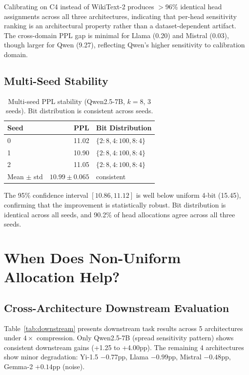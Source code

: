 \documentclass[11pt,a4paper]{article}
\begin{document}
Calibrating on C4 instead of WikiText-2 produces $>$96\% identical head assignments across all three architectures, indicating that per-head sensitivity ranking is an architectural property rather than a dataset-dependent artifact.
The cross-domain PPL gap is minimal for Llama (0.20) and Mistral (0.03), though larger for Qwen (9.27), reflecting Qwen's higher sensitivity to calibration domain.

\subsection{Multi-Seed Stability}

\begin{table}[h]
\centering
\caption{Multi-seed PPL stability (Qwen2.5-7B, $k{=}8$, 3 seeds). Bit distribution is consistent across seeds.}
\label{tab:multi_seed}
\begin{tabular}{@{}lrl@{}}
\toprule
Seed & PPL & Bit Distribution \\
\midrule
0 & 11.02 & $\{2{:}8, 4{:}100, 8{:}4\}$ \\
1 & 10.90 & $\{2{:}8, 4{:}100, 8{:}4\}$ \\
2 & 11.05 & $\{2{:}8, 4{:}100, 8{:}4\}$ \\
\midrule
Mean $\pm$ std & $10.99 \pm 0.065$ & consistent \\
\bottomrule
\end{tabular}
\end{table}

The 95\% confidence interval $[10.86, 11.12]$ is well below uniform 4-bit (15.45), confirming that the improvement is statistically robust.
Bit distribution is identical across all seeds, and 90.2\% of head allocations agree across all three seeds.


\section{When Does Non-Uniform Allocation Help?}
\label{sec:when_helps}

\subsection{Cross-Architecture Downstream Evaluation}

Table~\ref{tab:downstream} presents downstream task results across 5 architectures under $4\times$ compression.
Only Qwen2.5-7B (spread sensitivity pattern) shows consistent downstream gains (+1.25 to +4.00pp).
The remaining 4 architectures show minor degradation: Yi-1.5 $-0.77$pp, Llama $-0.99$pp, Mistral $-0.48$pp, Gemma-2 $+0.14$pp (noise).
\end{document}
